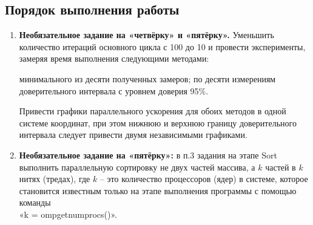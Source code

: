 { %
	\subsection{Порядок выполнения работы}
	\begin{enumerate}
		 программе, полученной в результате выполнения ЛР-3, так изменить этап Generate, чтобы генерируемый набор случайных чисел не зависел от количества потоков, выполняющих программу. Например, на каждой итерации $i$ перед вызовом rand\textunderscore r можно вызывать функцию srand(f(i)), где f – произвольно выбранная функция. Можно придумать и использовать любой другой способ.
		 вызовы функции gettimeofday на omp\textunderscore get\textunderscore wtime.
		 вычисления на этапе Sort, для чего выполнить сортировку в два этапа: 
			\begin{itemize}
				 первую и вторую половину массива в двух независимых нитях (можно использовать OpenMP-директиву ''parallel sections''); 
				 отсортированные половины в единый массив.
			\end{itemize}
		 функцию, которая один раз в секунду выводит в консоль сообщение о текущем проценте завершения работы программы. Указанную функцию необходимо запустить в отдельном потоке, параллельно работающем с основным вычислительным циклом.
		 прямую совместимость (forward compatibility) написанной параллельной программы. Для этого все вызываемые функции вида «omp\textunderscore *» можно условно переопределить в препроцессорных директивах, например, так:
			\begin{figure}[H]
				\texttt{[image: lab4Example]}
			\end{figure}
		 эксперименты, варьируя $N$ от $min(\frac{N_x}{2},\;N_1)$ до $N_2$, где значения $N_1$ и $N_2$ взять из ЛР-1, а $N_x$ – это такое значение $N$, при котором накладные расходы на распараллеливание превышают выигрыш от распараллеливания. Написать отчёт о проделанной работе. Подготовиться к устным вопросам на защите.
		\item\textbf{Необязательное задание на «четвёрку» и «пятёрку».} Уменьшить количество итераций основного цикла с 100 до 10 и провести эксперименты, замеряя время выполнения следующими методами: 
			\begin{itemize}
				 минимального из десяти полученных замеров; 
				 по десяти измерениям доверительного интервала с уровнем доверия 95\%.
			\end{itemize}
			Привести графики параллельного ускорения для обоих методов в одной системе координат, при этом нижнюю и верхнюю границу доверительного интервала следует привести двумя независимыми графиками.
		\item\textbf{Необязательное задание на «пятёрку»:} в п.3 задания на этапе Sort выполнить параллельную сортировку не двух частей массива, а $k$ частей в $k$ нитях (тредах), где $k$ – это количество процессоров (ядер) в системе, которое становится известным только на этапе выполнения программы с помощью команды \\«k = omp\textunderscore get\textunderscore num\textunderscore procs()».
	\end{enumerate}
}